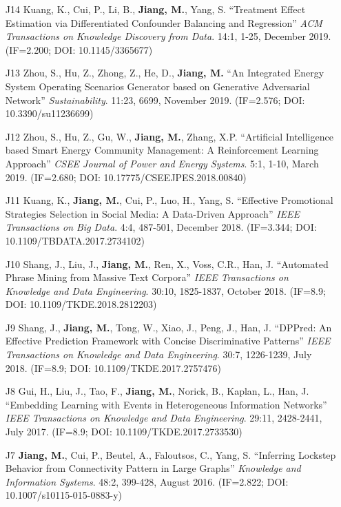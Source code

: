 \documentclass[10pt]{article}
\newenvironment{myindentpar}[1]%
{\begin{list}{}%
         {\setlength{\leftmargin}{#1}}%
         \item[]%
}
{\end{list}}
\newcounter{list}
\begin{document}
\begin{myindentpar}{0.00cm}
\begin{enumerate}[leftmargin=.5cm]
\item[J14] Kuang, K., Cui, P., Li, B., \textbf{Jiang, M.}, Yang, S. ``Treatment Effect Estimation via Differentiated Confounder Balancing and Regression'' \textit{ACM Transactions on Knowledge Discovery from Data}. 14:1, 1-25, December 2019. (IF=2.200; DOI: 10.1145/3365677)
	
\item[J13] Zhou, S., Hu, Z., Zhong, Z., He, D., \textbf{Jiang, M.} ``An Integrated Energy System Operating Scenarios Generator based on Generative Adversarial Network'' \textit{Sustainability}. 11:23, 6699, November 2019. (IF=2.576; DOI: 10.3390/su11236699)

\item[J12] Zhou, S., Hu, Z., Gu, W., \textbf{Jiang, M.}, Zhang, X.P. ``Artificial Intelligence based Smart Energy Community Management: A Reinforcement Learning Approach'' \textit{CSEE Journal of Power and Energy Systems}. 5:1, 1-10, March 2019. (IF=2.680; DOI: 10.17775/CSEEJPES.2018.00840)

\item[J11] Kuang, K., \textbf{Jiang, M.}, Cui, P., Luo, H., Yang, S. ``Effective Promotional Strategies Selection in Social Media: A Data-Driven Approach'' \textit{IEEE Transactions on Big Data}. 4:4, 487-501, December 2018. (IF=3.344; DOI: 10.1109/TBDATA.2017.2734102)

\item[J10] Shang, J., Liu, J., \textbf{Jiang, M.}, Ren, X., Voss, C.R., Han, J. ``Automated Phrase Mining from Massive Text Corpora'' \textit{IEEE Transactions on Knowledge and Data Engineering}. 30:10, 1825-1837, October 2018. (IF=8.9; DOI: 10.1109/TKDE.2018.2812203)

\item[J9] Shang, J., \textbf{Jiang, M.}, Tong, W., Xiao, J., Peng, J., Han, J. ``DPPred: An Effective Prediction Framework with Concise Discriminative Patterns'' \textit{IEEE Transactions on Knowledge and Data Engineering}. 30:7, 1226-1239, July 2018. (IF=8.9; DOI: 10.1109/TKDE.2017.2757476)

\item[J8] Gui, H., Liu, J., Tao, F., \textbf{Jiang, M.}, Norick, B., Kaplan, L., Han, J. ``Embedding Learning with Events in Heterogeneous Information Networks'' \textit{IEEE Transactions on Knowledge and Data Engineering}. 29:11, 2428-2441, July 2017. (IF=8.9; DOI: 10.1109/TKDE.2017.2733530)

\item[J7] \textbf{Jiang, M.}, Cui, P., Beutel, A., Faloutsos, C., Yang, S. ``Inferring Lockstep Behavior from Connectivity Pattern in Large Graphs'' \textit{Knowledge and Information Systems}. 48:2, 399-428, August 2016. (IF=2.822; DOI: 10.1007/s10115-015-0883-y)


\end{enumerate}
\end{myindentpar}
\end{document}
